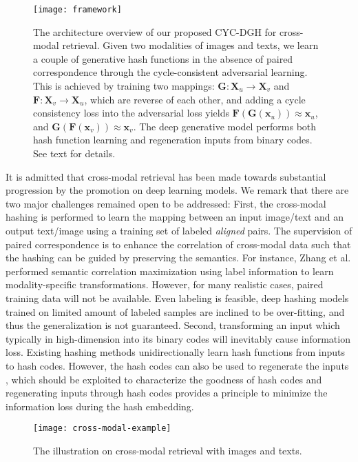 \documentclass[10pt,journal,twocolumn]{IEEEtran}
\begin{document}
\begin{figure}[t]
\centering
\texttt{[image: framework]}
\caption{The architecture overview of our proposed CYC-DGH for cross-modal retrieval. Given two modalities of images and texts, we learn a couple of generative hash functions in the absence of paired correspondence through the cycle-consistent adversarial learning. This is achieved by training two mappings: $\boldsymbol G: \boldsymbol X_u \rightarrow \boldsymbol X_v$ and $\boldsymbol F: \boldsymbol X_v \rightarrow \boldsymbol X_u$, which are reverse of each other, and adding a cycle consistency loss into the adversarial loss yields $\boldsymbol F(\boldsymbol G (\boldsymbol x_u)) \approx \boldsymbol x_u$, and $\boldsymbol G(\boldsymbol F (\boldsymbol x_v)) \approx \boldsymbol x_v$. The deep generative model performs both hash function learning and regeneration inputs from binary codes. See text for details.}
\label{fig:framework}
\end{figure}


It is admitted that cross-modal retrieval has been made towards substantial progression by the promotion on deep learning models. We remark that there are two major challenges remained open to be addressed: First, the cross-modal hashing is performed to learn the mapping between an input image/text and an output text/image using a training set of labeled \textit{aligned} pairs. The supervision of paired correspondence is to enhance the correlation of cross-modal data such that the hashing can be guided by preserving the semantics. For instance, Zhang et al. \cite{SCM} performed semantic correlation maximization using label information to learn modality-specific transformations. However, for many realistic cases, paired training data will not be available. Even labeling is feasible, deep hashing models trained on limited amount of labeled samples are inclined to be over-fitting, and thus the generalization is not guaranteed. Second, transforming an input which typically in high-dimension into its binary codes will inevitably cause information loss. Existing hashing methods unidirectionally learn hash functions from inputs to hash codes. However, the hash codes can also be used to regenerate the inputs \cite{SGH,Reconstruction-hashing}, which should be exploited to characterize the goodness of hash codes and regenerating inputs through hash codes provides a principle to minimize the information loss during the hash embedding.

\begin{figure}[t]
\centering
\texttt{[image: cross-modal-example]}
\caption{The illustration on cross-modal retrieval with images and texts.}
\label{fig:cross-modal-example}
\end{figure}
\end{document}
